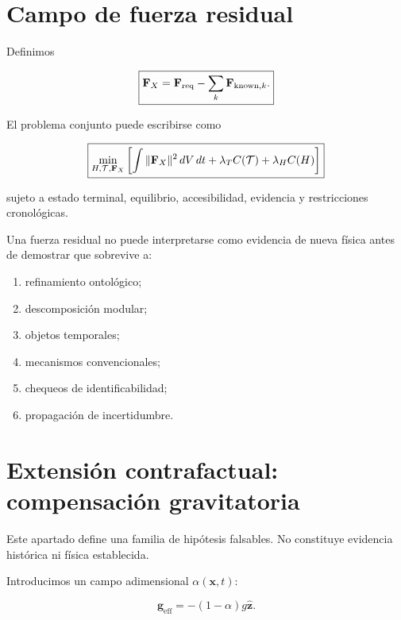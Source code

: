 \section{Campo de fuerza residual}

Definimos

\begin{definition}
\begin{equation}
\boxed{
\mathbf F_X
=
\mathbf F_{\mathrm{req}}
-
\sum_k
\mathbf F_{{\mathrm{known}},k}.
}
\end{equation}
\end{definition}

El problema conjunto puede escribirse como

\begin{equation}
\boxed{
\min_{H,\mathcal T,\mathbf F_X}
\left[
\int
\|\mathbf F_X\|^2\,dV\,dt
+
\lambda_T C(\mathcal T)
+
\lambda_H C(H)
\right]
}
\end{equation}

sujeto a estado terminal, equilibrio, accesibilidad, evidencia y restricciones cronológicas.

\begin{principle}
Una fuerza residual no puede interpretarse como evidencia de nueva física antes de demostrar que sobrevive a:
\begin{enumerate}
\item refinamiento ontológico;
\item descomposición modular;
\item objetos temporales;
\item mecanismos convencionales;
\item chequeos de identificabilidad;
\item propagación de incertidumbre.
\end{enumerate}
\end{principle}

\section{Extensión contrafactual: compensación gravitatoria}

Este apartado define una familia de hipótesis falsables. No constituye evidencia histórica ni física establecida.

Introducimos un campo adimensional \(\alpha(\mathbf x,t)\):

\begin{equation}
\mathbf g_{\mathrm{eff}}
=
-(1-\alpha)g\hat{\mathbf z}.
\end{equation}

